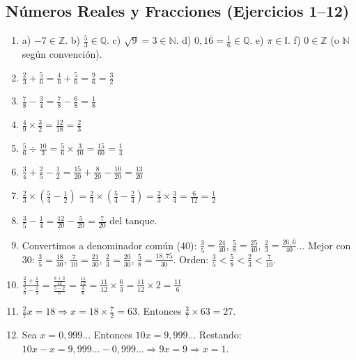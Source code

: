 \documentclass[12pt, a4paper]{article}
\begin{document}
\subsection*{Números Reales y Fracciones (Ejercicios 1--12)}

\begin{enumerate}[leftmargin=*, label=\textbf{\arabic*.}]
  \item a) $-7 \in \mathbb{Z}$. \quad b) $\frac{5}{3} \in \mathbb{Q}$. \quad c) $\sqrt{9} = 3 \in \mathbb{N}$. \quad d) $0{,}1\overline{6} = \frac{1}{6} \in \mathbb{Q}$. \quad e) $\pi \in \mathbb{I}$. \quad f) $0 \in \mathbb{Z}$ (o $\mathbb{N}$ según convención).

  \item $\frac{2}{3} + \frac{5}{6} = \frac{4}{6} + \frac{5}{6} = \frac{9}{6} = \frac{3}{2}$

  \item $\frac{7}{8} - \frac{3}{4} = \frac{7}{8} - \frac{6}{8} = \frac{1}{8}$

  \item $\frac{4}{9} \times \frac{3}{2} = \frac{12}{18} = \frac{2}{3}$

  \item $\frac{5}{6} \div \frac{10}{3} = \frac{5}{6} \times \frac{3}{10} = \frac{15}{60} = \frac{1}{4}$

  \item $\frac{3}{4} + \frac{2}{5} - \frac{1}{2} = \frac{15}{20} + \frac{8}{20} - \frac{10}{20} = \frac{13}{20}$

  \item $\frac{2}{3} \times \left(\frac{5}{4} - \frac{1}{2}\right) = \frac{2}{3} \times \left(\frac{5}{4} - \frac{2}{4}\right) = \frac{2}{3} \times \frac{3}{4} = \frac{6}{12} = \frac{1}{2}$

  \item $\frac{3}{5} - \frac{1}{4} = \frac{12}{20} - \frac{5}{20} = \frac{7}{20}$ del tanque.

  \item Convertimos a denominador común (40): $\frac{3}{5} = \frac{24}{40}$, $\frac{5}{8} = \frac{25}{40}$, $\frac{2}{3} = \frac{26{,}\overline{6}}{40}$... Mejor con 30: $\frac{3}{5} = \frac{18}{30}$, $\frac{7}{10} = \frac{21}{30}$, $\frac{2}{3} = \frac{20}{30}$, $\frac{5}{8} = \frac{18{,}75}{30}$. Orden: $\frac{3}{5} < \frac{5}{8} < \frac{2}{3} < \frac{7}{10}$.

  \item $\frac{\frac{2}{3} + \frac{1}{4}}{\frac{5}{6} - \frac{1}{3}} = \frac{\frac{8+3}{12}}{\frac{5-2}{6}} = \frac{\frac{11}{12}}{\frac{3}{6}} = \frac{11}{12} \times \frac{6}{3} = \frac{11}{12} \times 2 = \frac{11}{6}$

  \item $\frac{2}{7}x = 18 \Rightarrow x = 18 \times \frac{7}{2} = 63$. Entonces $\frac{3}{7} \times 63 = 27$.

  \item Sea $x = 0{,}999\ldots$ Entonces $10x = 9{,}999\ldots$ Restando: $10x - x = 9{,}999\ldots - 0{,}999\ldots \Rightarrow 9x = 9 \Rightarrow x = 1$.
\end{enumerate}
\end{document}
